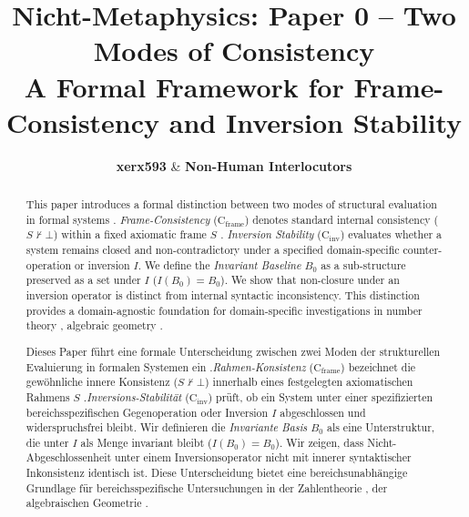 \documentclass[11pt,a4paper]{article}
\title{%
  \textbf{Nicht-Metaphysics: Paper 0 -- Two Modes of Consistency}\\
  \large A Formal Framework for Frame-Consistency and Inversion Stability%
}
\author{%
  \textbf{xerx593} \quad \& \quad \textbf{Non-Human Interlocutors}%
}
\date{\apophaticdate}
\begin{document}
\maketitle

\begin{abstract}
This paper introduces a formal distinction between two modes of structural 
evaluation in formal systems \cite{nicht_theory_monograph, godel1931formal}.
\emph{Frame-Consistency} ($\mathrm{C}_{\mathrm{frame}}$) 
denotes standard internal consistency ($S \nvdash \bot$) within a fixed 
axiomatic frame $S$ \cite{tarski1936begriff}. \emph{Inversion Stability}
($\mathrm{C}_{\mathrm{inv}}$) evaluates 
whether a system remains closed and non-contradictory under a specified 
domain-specific counter-operation or inversion $I$. We define the 
\emph{Invariant Baseline} $B_0$ as a sub-structure preserved as a set 
under $I$ ($I(B_0) = B_0$). We show that non-closure under an inversion 
operator is distinct from internal syntactic inconsistency. This distinction 
provides a domain-agnostic foundation for domain-specific investigations 
in number theory \cite{riemann1859ueber}, algebraic geometry
\cite{hodge1950topological}.
\end{abstract}

\vspace{0.3cm}

\begin{otherlanguage}{ngerman}
\begin{abstract}
Dieses Paper führt eine formale Unterscheidung zwischen zwei Moden der 
strukturellen Evaluierung in formalen Systemen ein
\cite{nicht_theory_monograph, godel1931formal}.\emph{Rahmen-Konsistenz} 
($\mathrm{C}_{\mathrm{frame}}$) bezeichnet die gewöhnliche innere Konsistenz
($S \nvdash \bot$) innerhalb eines festgelegten axiomatischen Rahmens 
$S$ \cite{tarski1936begriff}.\emph{Inversions-Stabilität} ($\mathrm{C}_{\mathrm{inv}}$)
prüft, ob ein System unter einer spezifizierten bereichsspezifischen Gegenoperation
oder Inversion $I$ abgeschlossen und widerspruchsfrei bleibt. Wir definieren die
\emph{Invariante Basis} $B_0$ als eine Unterstruktur, die unter $I$ als 
Menge invariant bleibt ($I(B_0) = B_0$). Wir zeigen, dass 
Nicht-Abgeschlossenheit unter einem Inversionsoperator nicht mit innerer 
syntaktischer Inkonsistenz identisch ist. Diese Unterscheidung
bietet eine bereichsunabhängige Grundlage für bereichsspezifische Untersuchungen
in der Zahlentheorie \cite{riemann1859ueber}, der algebraischen Geometrie
 \cite{hodge1950topological}.
\end{abstract}
\end{otherlanguage}
\end{document}
